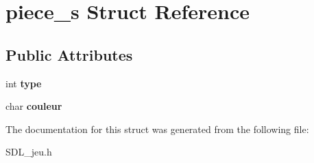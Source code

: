 \hypertarget{structpiece__s}{}\section{piece\+\_\+s Struct Reference}
\label{structpiece__s}
\subsection*{Public Attributes}
\begin{DoxyCompactItemize}
\item 
\mbox{\label{structpiece__s_ad285674b8c721dd6e3d116e3ce71e352}} 
int {\bfseries type}
\item 
\mbox{\label{structpiece__s_aa7a6d0ae7aad28377b97fbc276f6fd41}} 
char {\bfseries couleur}
\end{DoxyCompactItemize}


The documentation for this struct was generated from the following file\+:\begin{DoxyCompactItemize}
\item 
S\+D\+L\+\_\+jeu.\+h\end{DoxyCompactItemize}

